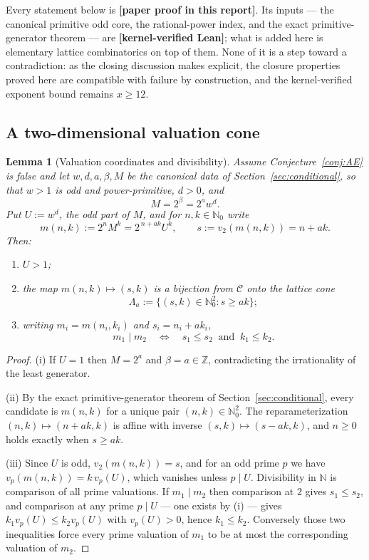 \documentclass[11pt,oneside]{article}
\newtheorem{lemma}[theorem]{Lemma}
\theoremstyle{definition}
\theoremstyle{remark}
\newcommand{\N}{\mathbb N}
\newcommand{\Nzero}{\mathbb N_0}
\newcommand{\Z}{\mathbb Z}
\newcommand{\Cand}{\mathcal C}
\newcommand{\vpp}[2]{v_{#1}\!\left(#2\right)}
\newcommand{\statuslean}{\textcolor{leanblue}{\textbf{[kernel-verified Lean]}}}
\newcommand{\statusnew}{\textcolor{newgreen}{\textbf{[paper proof in this report]}}}
\begin{document}
Every statement below is \statusnew{}.  Its inputs --- the canonical primitive odd core, the
rational-power index, and the exact primitive-generator theorem --- are \statuslean{}; what is
added here is elementary lattice combinatorics on top of them.  None of it is a step toward a
contradiction: as the closing discussion makes explicit, the closure properties proved here are
compatible with failure by construction, and the kernel-verified exponent bound remains
$x\ge12$.

\subsection{A two-dimensional valuation cone}

\begin{lemma}[Valuation coordinates and divisibility]
\label{lt:lem-cone}
Assume Conjecture~\ref{conj:AE} is false and let $w,d,a,\beta,M$ be the canonical data of
Section~\ref{sec:conditional}, so that $w>1$ is odd and power-primitive, $d>0$, and
\[
 M=2^{\beta}=2^aw^d .
\]
Put $U:=w^d$, the odd part of $M$, and for $n,k\in\Nzero$ write
\[
 m(n,k):=2^nM^k=2^{\,n+ak}U^k,
 \qquad s:=\vpp{2}{m(n,k)}=n+ak .
\]
Then:
\begin{enumerate}[label=\textup{(\roman*)}]
\item $U>1$;
\item the map $m(n,k)\mapsto(s,k)$ is a bijection from $\Cand$ onto the lattice cone
\[
 \Lambda_a:=\{(s,k)\in\Nzero^2:s\ge ak\};
\]
\item writing $m_i=m(n_i,k_i)$ and $s_i=n_i+ak_i$,
\begin{equation}
 m_1\mid m_2
 \quad\Longleftrightarrow\quad
 s_1\le s_2\ \text{ and }\ k_1\le k_2 .
 \label{lt:eq-divisibility-coordinates}
\end{equation}
\end{enumerate}
\end{lemma}

\begin{proof}
(i) If $U=1$ then $M=2^a$ and $\beta=a\in\Z$, contradicting the irrationality of the least
generator.

(ii) By the exact primitive-generator theorem of Section~\ref{sec:conditional}, every candidate
is $m(n,k)$ for a unique pair $(n,k)\in\Nzero^2$.  The reparameterization $(n,k)\mapsto(n+ak,k)$
is affine with inverse $(s,k)\mapsto(s-ak,k)$, and $n\ge0$ holds exactly when $s\ge ak$.

(iii) Since $U$ is odd, $\vpp{2}{m(n,k)}=s$, and for an odd prime $p$ we have
$\vpp{p}{m(n,k)}=k\,\vpp{p}{U}$, which vanishes unless $p\mid U$.  Divisibility in $\N$ is
comparison of all prime valuations.  If $m_1\mid m_2$ then comparison at $2$ gives $s_1\le s_2$,
and comparison at any prime $p\mid U$ --- one exists by (i) --- gives $k_1\vpp{p}{U}\le
k_2\vpp{p}{U}$ with $\vpp{p}{U}>0$, hence $k_1\le k_2$.  Conversely those two inequalities
force every prime valuation of $m_1$ to be at most the corresponding valuation of $m_2$.
\end{proof}
\end{document}
